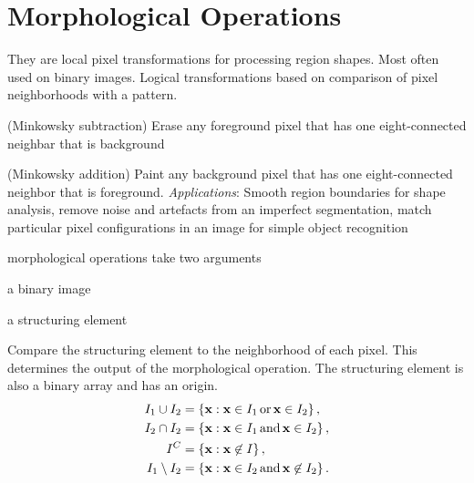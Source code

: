 \section{Morphological Operations}
They are local pixel transformations for processing region shapes. Most often used on binary images. Logical transformations based on comparison of pixel neighborhoods with a pattern.
\begin{compactdesc}
\item[\lp{8-neighbor erode}] (Minkowsky subtraction) Erase any foreground pixel that has one eight-connected neighbar that is background
\item[\lp{8-neighbor dilate}] (Minkowsky addition) Paint any background pixel that has one eight-connected neighbor that is foreground. \emph{Applications}: Smooth region boundaries for shape analysis, remove noise and artefacts from an imperfect segmentation, match particular pixel configurations in an image for simple object recognition
	\item[\lp{structuring elements}] morphological operations take two arguments
		\begin{inparaenum}[1.]
			\item a binary image
			\item a structuring element
		\end{inparaenum}
	Compare the structuring element to the neighborhood of each pixel. This determines the output of the morphological operation. The structuring element is also a binary array and has an origin.
	\begin{align*}
		I_1\cup I_2&=\left\{ \boldsymbol{\mathrm{x}}:\boldsymbol{\mathrm{x}}\in I_1\,\text{or}\,\boldsymbol{\mathrm{x}}\in I_2 \right\},\\
		I_2\cap I_2&=\left\{ \boldsymbol{\mathrm{x}}:\boldsymbol{\mathrm{x}}\in I_1\,\text{and}\,\boldsymbol{\mathrm{x}}\in I_2 \right\},\\
		I^{C}&=\left\{ \boldsymbol{\mathrm{x}}:\boldsymbol{\mathrm{x}}\not\in I \right\},\\
		I_1\setminus I_2&=\left\{ \boldsymbol{\mathrm{x}}:\boldsymbol{\mathrm{x}}\in I_2\,\text{and}\,\boldsymbol{\mathrm{x}}\not\in I_2 \right\}.
	\end{align*}

\end{compactdesc}
